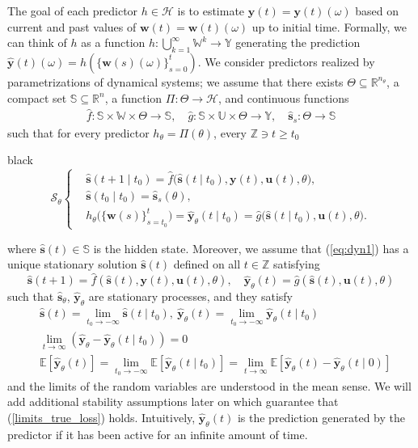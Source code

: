 \documentclass{ifacconf}
\def\eqref#1{(\ref{#1})}
\def\rvu{{\mathbf{i}}}
\def\rvs{{\mathbf{s}}}
\def\rvu{{\mathbf{u}}}
\def\rvw{{\mathbf{w}}}
\def\rvy{{\mathbf{y}}}
\def\vs{{\bm{s}}}
\def\vw{{\bm{w}}}
\def\vy{{\bm{y}}}
\def\sS{{\mathbb{S}}}
\def\sU{{\mathbb{U}}}
\def\sW{{\mathbb{W}}}
\def\sY{{\mathbb{Y}}}
\newcommand{\E}{\mathbb{E}}
\newcommand{\reals}{\mathbb{R}}
\begin{document}
The goal of each predictor $h\in\mathcal{H}$ is to estimate $\vy(t)=\rvy(t)(\omega)$ based on current and past values of $\vw(t)=\rvw(t)(\omega)$ up to initial time. Formally, we can think of $h$ as a 
function $h:\bigcup_{k=1}^{\infty} \sW^k \rightarrow \sY$ generating the prediction $\hat{\rvy}(t)(\omega)=h(\{\rvw(s)(\omega)\}_{s=0}^t)$.
We consider predictors realized by parametrizations of dynamical systems; we
assume that there exists  $\Theta\subseteq \reals^{n_\theta}$, a compact set $\sS \subseteq \mathbb{R}^n$,
a function $\Pi: \Theta \rightarrow \mathcal{H}$, and continuous functions
\begin{align*}
    \hat{f}:\sS \times \sW \times \Theta \rightarrow \sS, \quad
    \hat{g}: \sS \times \sU \times \Theta \rightarrow \sY, \quad 
    \hat{\vs}_s:\Theta \rightarrow \sS
\end{align*}
such that  for every predictor $h_{\theta}=\Pi(\theta)$, every $\mathbb{Z} \ni t \ge t_0$
\begin{color}{black}
\begin{equation}\label{eq:dyn1}
\mathcal{S}_{\theta}\left\{
\begin{aligned}
  & \hat{\rvs}(t+1 \mid t_0)=\hat{f}\bigl(\hat{\rvs}(t \mid t_0),\rvy(t),\rvu(t),\theta\bigr),\\
  & \hat{\rvs}(t_0 \mid t_0)=\hat{\vs}_s(\theta),\\
  & h_{\theta}\bigl(\{\rvw(s)\}_{s=t_0}^t\bigr)=\hat{\rvy}_{\theta}(t \mid t_0)=\hat{g}\bigl(\hat{\rvs}(t \mid t_0),\rvu(t),\theta\bigr).
\end{aligned}
\right.
\end{equation}
\end{color}
where $\hat{\rvs}(t)\in \sS$ is the hidden state. Moreover, we assume that \eqref{eq:dyn1} has a unique stationary solution 
$\hat{\rvs}(t)$ defined on all $t \in \mathbb{Z}$ satisfying 
\[ 
    \hat{\rvs}(t+1)=\hat{f}(\hat{\rvs}(t),\rvy(t),\rvu(t),\theta), \quad \hat{\rvy}_{\theta}(t)=\hat{g}(\hat{\rvs}(t),\rvu(t),\theta)
\]
such that $\hat{\rvs}_{\theta}$, $\hat{\rvy}_{\theta}$ are stationary processes, and they satisfy
\begin{equation}
  \label{limits_true_loss}
  \begin{split}
      & \hat{\rvs}(t)=\lim_{t_0 \to -\infty} \hat{\rvs}(t \mid t_0),  ~
      \hat{\rvy}_{\theta}(t)=\lim_{t_0 \to -\infty} \hat{\rvy}_{\theta}(t \mid t_0) \\
      & \lim_{t \rightarrow \infty} (\hat{\rvy}_{\theta}-\hat{\rvy}_{\theta}(t \mid t_0))=0 \\
      & \E[\hat{\rvy}_{\theta}(t)]=\lim_{t_0 \to -\infty} \E[\hat{\rvy}_{\theta}(t \mid t_0)]=\lim_{t \rightarrow \infty} \E[\hat{\rvy}_{\theta}(t)-\hat{\rvy}_{\theta}(t \mid 0)]
  \end{split}
\end{equation}      
  and the limits of the random variables are understood in the mean sense. 
We will add additional stability assumptions later on which guarantee that \eqref{limits_true_loss} holds.
Intuitively, $\hat{\rvy}_{\theta}(t)$ is the prediction generated by the predictor if it has been 
active for an infinite amount of time. 
\end{document}

